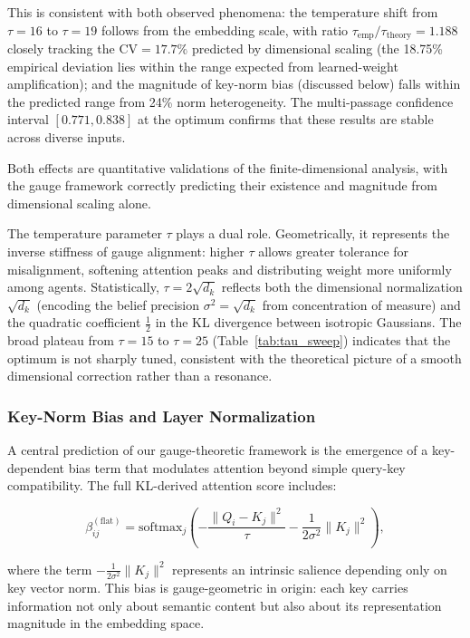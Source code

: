 \documentclass[twoside,11pt]{article}
\begin{document}
This is consistent with both observed phenomena: the temperature shift from $\tau = 16$ to $\tau = 19$ follows from the embedding scale, with ratio $\tau_{\text{emp}}/\tau_{\text{theory}} = 1.188$ closely tracking the $\text{CV} = 17.7\%$ predicted by dimensional scaling (the 18.75\% empirical deviation lies within the range expected from learned-weight amplification); and the magnitude of key-norm bias (discussed below) falls within the predicted range from 24\% norm heterogeneity. The multi-passage confidence interval $[0.771, 0.838]$ at the optimum confirms that these results are stable across diverse inputs.

Both effects are quantitative validations of the finite-dimensional analysis, with the gauge framework correctly predicting their existence and magnitude from dimensional scaling alone.

The temperature parameter $\tau$ plays a dual role. Geometrically, it represents the inverse stiffness of gauge alignment: higher $\tau$ allows greater tolerance for misalignment, softening attention peaks and distributing weight more uniformly among agents. Statistically, $\tau = 2\sqrt{d_k}$ reflects both the dimensional normalization $\sqrt{d_k}$ (encoding the belief precision $\sigma^2 = \sqrt{d_k}$ from concentration of measure) and the quadratic coefficient $\frac{1}{2}$ in the KL divergence between isotropic Gaussians. The broad plateau from $\tau = 15$ to $\tau = 25$ (Table~\ref{tab:tau_sweep}) indicates that the optimum is not sharply tuned, consistent with the theoretical picture of a smooth dimensional correction rather than a resonance.


\subsubsection{Key-Norm Bias and Layer Normalization}

A central prediction of our gauge-theoretic framework is the emergence of a key-dependent bias term that modulates attention beyond simple query-key compatibility. The full KL-derived attention score includes:

\begin{equation}
\beta_{ij}^{(\text{flat})} = \text{softmax}_j\left( -\frac{\|Q_i - K_j\|^2}{\tau} - \frac{1}{2\sigma^2}\|K_j\|^2 \right),
\end{equation}

where the term $-\frac{1}{2\sigma^2}\|K_j\|^2$ represents an intrinsic salience depending only on key vector norm. This bias is gauge-geometric in origin: each key carries information not only about semantic content but also about its representation magnitude in the embedding space.
\end{document}
